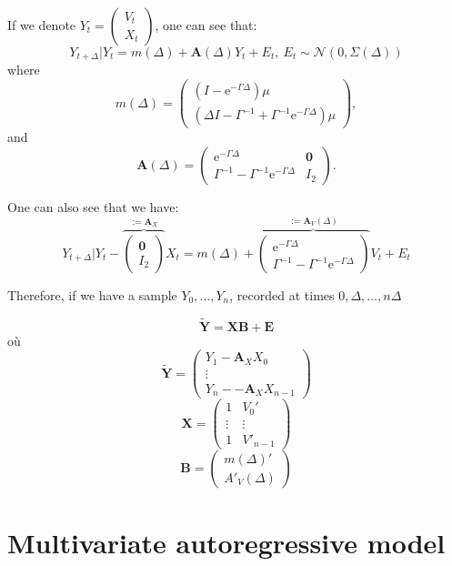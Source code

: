 \documentclass[
]{book}
\newcommand{\e}{\text{e}}
\newcommand{\inv}{^{-1}}
\begin{document}
If we denote \(Y_t = \begin{pmatrix} V_{t} \\ X_{t} \end{pmatrix}\), one can see that:
\begin{equation*}
Y_{t + \Delta}\vert Y_t = m(\Delta) + \mathbf{A}(\Delta)  Y_t + E_t,~E_t \sim\mathcal{N}(0,\Sigma(\Delta))
\end{equation*}
where
\[
m(\Delta) =
\begin{pmatrix}
(I - \e^{-\Gamma\Delta}) \mu\\
(\Delta I - \Gamma\inv + \Gamma\inv\e^{-\Gamma\Delta})\mu
\end{pmatrix},
\]
and
\[\mathbf{A}\left(\Delta\right) = \begin{pmatrix}\e^{-\Gamma\Delta} & \mathbf{0} \\
\Gamma\inv - \Gamma\inv\e^{-\Gamma\Delta} &I_2\end{pmatrix}.\]

One can also see that we have:
\[Y_{t + \Delta}\vert Y_t - \overbrace{\begin{pmatrix}\mathbf{0} \\
I_2\end{pmatrix}}^{:= \mathbf{A}_X}X_t = m(\Delta) +  \overbrace{\begin{pmatrix}\e^{-\Gamma\Delta}\\
\Gamma\inv - \Gamma\inv\e^{-\Gamma\Delta}\end{pmatrix}}^{:=\mathbf{A}_V(\Delta)} V_t + E_t\]

Therefore, if we have a sample \(Y_0,\dots, Y_n\), recorded at times \(0,\Delta,\dots, n\Delta\)

\[\tilde{\mathbf{Y}} = \mathbf{X}\mathbf{B} + \mathbf{E}\]
où
\[\tilde{\mathbf{Y}} = \begin{pmatrix}Y_{1} -\mathbf{A}_X X_0 \\
\vdots \\ 
Y_{n} - -\mathbf{A}_X X_{n - 1}
\end{pmatrix}\]
\[\mathbf{X} = \begin{pmatrix}
1 & V_0'\\
\vdots & \vdots \\
1 & V'_{n -1}
\end{pmatrix}\]
\[\mathbf{B} = \begin{pmatrix}
m(\Delta)'\\
A'_V(\Delta)
\end{pmatrix}\]

\hypertarget{simpleAR}{%
\chapter{Multivariate autoregressive model}\label{simpleAR}}
\end{document}
